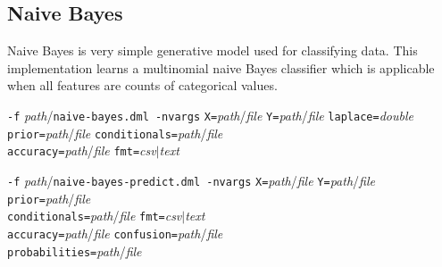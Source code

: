 \begin{comment}

 Licensed to the Apache Software Foundation (ASF) under one
 or more contributor license agreements.  See the NOTICE file
 distributed with this work for additional information
 regarding copyright ownership.  The ASF licenses this file
 to you under the Apache License, Version 2.0 (the
 "License"); you may not use this file except in compliance
 with the License.  You may obtain a copy of the License at

   http://www.apache.org/licenses/LICENSE-2.0

 Unless required by applicable law or agreed to in writing,
 software distributed under the License is distributed on an
 "AS IS" BASIS, WITHOUT WARRANTIES OR CONDITIONS OF ANY
 KIND, either express or implied.  See the License for the
 specific language governing permissions and limitations
 under the License.

\end{comment}

\subsection{Naive Bayes}
\label{naive_bayes}


Naive Bayes is very simple generative model used for classifying data. 
This implementation learns a multinomial naive Bayes classifier which
is applicable when all features are counts of categorical values.
\\


\begin{tabbing}
\texttt{-f} \textit{path}/\texttt{naive-bayes.dml -nvargs} 
\=\texttt{X=}\textit{path}/\textit{file} 
  \texttt{Y=}\textit{path}/\textit{file} 
  \texttt{laplace=}\textit{double}\\
\>\texttt{prior=}\textit{path}/\textit{file}
  \texttt{conditionals=}\textit{path}/\textit{file}\\
\>\texttt{accuracy=}\textit{path}/\textit{file}
  \texttt{fmt=}\textit{csv}$\vert$\textit{text}
\end{tabbing}

\begin{tabbing}
\texttt{-f} \textit{path}/\texttt{naive-bayes-predict.dml -nvargs} 
\=\texttt{X=}\textit{path}/\textit{file} 
  \texttt{Y=}\textit{path}/\textit{file} 
  \texttt{prior=}\textit{path}/\textit{file}\\
\>\texttt{conditionals=}\textit{path}/\textit{file}
  \texttt{fmt=}\textit{csv}$\vert$\textit{text}\\
\>\texttt{accuracy=}\textit{path}/\textit{file}
  \texttt{confusion=}\textit{path}/\textit{file}\\
\>\texttt{probabilities=}\textit{path}/\textit{file}
\end{tabbing}

